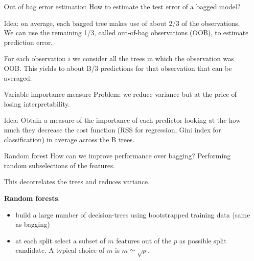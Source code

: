 \documentclass[notes]{beamer}          %
\begin{document}
\begin{frame}{Out of bag error estimation}
How to estimate the test error of a bagged model?

\vspace{0.5cm}

Idea: on average, each bagged tree makes use of about 2/3 of the observations. We can use the remaining 1/3, called out-of-bag observations (OOB), to estimate prediction error.

\vspace{0.5cm}

For each observation $i$ we consider all the trees in which the observation was OOB. This yields to about B/3 predictions for that observation that can be averaged.
\end{frame}

\begin{frame}{Variable importance measure}
Problem: we reduce variance but at the price of losing interpretability. 

\vspace{0.5cm}

Idea: Obtain a measure of the importance of each predictor looking at the how much they decrease the cost function (RSS for regression, Gini index for classification) in average across the B trees. 

\end{frame}

\begin{frame}{Random forest}
How can we improve performance over bagging? Performing random subselections of the features. 

\vspace{0.5cm}

This decorrelates the trees and reduces variance.

\vspace{0.5cm}

\textbf{Random forests}:

\begin{itemize}
 \item build a large number of decision-trees using bootstrapped training data (same as bagging)
 \item at each split select a subset of $m$ features out of the $p$ as possible split candidate. A typical choice of $m$ is $m \simeq \sqrt p$.
\end{itemize}

\end{frame}
\end{document}
